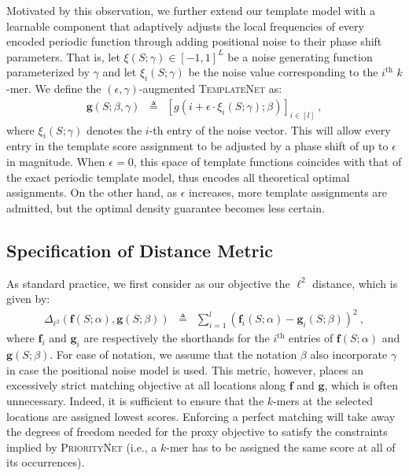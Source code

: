 Motivated by this observation, we further extend our template model with a learnable component that adaptively adjusts the local frequencies of every encoded periodic function through adding positional noise to their phase shift parameters. That is, let $\xi(S; \gamma) \in [-1, 1]^L$ be a noise generating function parameterized by $\gamma$ and let $\xi_i(S; \gamma)$ be the noise value corresponding to the $i^{\text{th}}$ $k$-mer. We define the $(\epsilon, \gamma)$-augmented \textsc{TemplateNet} as:
\begin{eqnarray}
\mathbf{g}(S; \beta, \gamma) &\triangleq& \left[g\left(i + \epsilon \cdot \xi_i(S; \gamma); \beta\right)\right]_{i \in [l]} \ ,
\end{eqnarray}
where $\xi_i(S;\gamma)$ denotes the $i$-th entry of the noise vector. This will allow every entry in the template score assignment to be adjusted by a phase shift of up to $\epsilon$ in magnitude. When $\epsilon = 0$, this space of template functions coincides with that of the exact periodic template model, thus encodes all theoretical optimal assignments. On the other hand, as $\epsilon$ increases, more template assignments are admitted, but the optimal density guarantee becomes less certain.

\subsection{Specification of Distance Metric}
\label{c5-sec:divergence}
As standard practice, we first consider as our objective the $\ell^2$ distance, which is given by:
\begin{eqnarray}
\Delta_{\ell^2}(\mathbf{f}(S;\alpha), \mathbf{g}(S;\beta)) &\triangleq& \sum_{i=1}^{l} (\mathbf{f}_i(S;\alpha) - \mathbf{g}_i(S;\beta))^2 \ ,
\end{eqnarray}
where $\mathbf{f}_i$ and $\mathbf{g}_i$ are respectively the shorthands for the $i^{\text{th}}$ entries of $\mathbf{f}(S; \alpha)$ and $\mathbf{g}(S; \beta)$. For ease of notation, we assume that the notation $\beta$ also incorporate $\gamma$ in case the positional noise model is used. This metric, however, places an excessively strict matching objective at all locations along $\mathbf{f}$ and $\mathbf{g}$, which is often unnecessary. Indeed, it is sufficient to ensure that the $k$-mers at the selected locations are assigned lowest scores. Enforcing a perfect matching will take away the degrees of freedom needed for the proxy objective to satisfy the constraints implied by \textsc{PriorityNet} (i.e., a $k$-mer has to be assigned the same score at all of its occurrences). 

